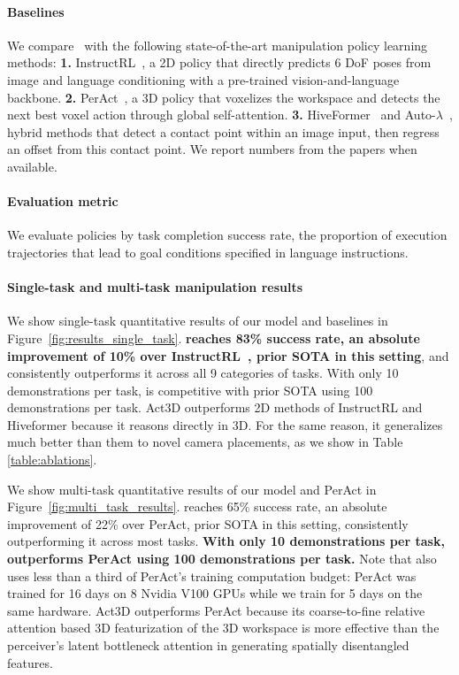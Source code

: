 \paragraph{Baselines} We compare \model{}~with the following state-of-the-art manipulation policy learning methods: 
\textbf{1.} InstructRL~\cite{liu2022instruction}, a 2D policy that directly predicts 6 DoF poses from image and language conditioning with a pre-trained vision-and-language backbone. 
\textbf{2.}  PerAct~\cite{shridhar2023perceiver},  a 3D policy that voxelizes the workspace and detects the next best voxel action through global self-attention. 
\textbf{3.} HiveFormer~\cite{guhur2023instruction} and Auto-$\lambda$~\cite{liu2022auto}, hybrid methods that detect a contact point within an image input, then regress an offset from this contact point. We report numbers from the papers when available.

\paragraph{Evaluation metric} 
We evaluate policies by task completion success rate, the proportion of execution trajectories that lead to goal conditions specified in language instructions.

\paragraph{Single-task and multi-task manipulation results} 
We show single-task quantitative results of our model and baselines in Figure~\ref{fig:results_single_task}. 
\model{} \textbf{reaches 83\% success rate, an absolute improvement of 10\% over InstructRL~\cite{liu2022instruction}, prior SOTA in this setting}, and consistently outperforms it across all 9 categories of tasks.
With only 10 demonstrations per task, \model{} is competitive with prior SOTA using 100 demonstrations per task. 
Act3D outperforms 2D methods of InstructRL and Hiveformer because it reasons directly  in 3D. 
For the same reason, it generalizes much better than them to novel camera placements, as we show in Table \ref{table:ablations}. 














We show multi-task quantitative results of our model and PerAct in Figure~\ref{fig:multi_task_results}.
\model{} reaches 65\% success rate, an absolute improvement of 22\% over PerAct, prior SOTA in this setting, consistently outperforming it across most tasks. 
\textbf{With only 10 demonstrations per task, \model{} outperforms PerAct using 100 demonstrations per task.}
Note that \model{} also uses less than a third of PerAct's training computation budget: PerAct was trained for 16 days on 8 Nvidia V100 GPUs while we train for 5 days on the same hardware. Act3D outperforms PerAct because its coarse-to-fine relative attention based 3D featurization of the 3D workspace is more effective than the perceiver’s latent bottleneck attention in generating spatially  disentangled features. 



